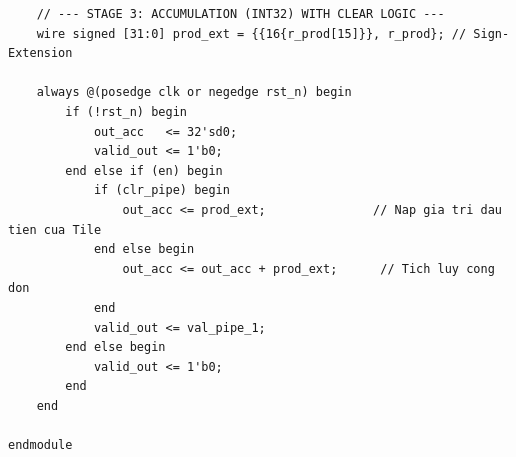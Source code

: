 \documentclass[11pt,a4paper]{article}
\begin{document}
\begin{lstlisting}
    // --- STAGE 3: ACCUMULATION (INT32) WITH CLEAR LOGIC ---
    wire signed [31:0] prod_ext = {{16{r_prod[15]}}, r_prod}; // Sign-Extension

    always @(posedge clk or negedge rst_n) begin
        if (!rst_n) begin
            out_acc   <= 32'sd0;
            valid_out <= 1'b0;
        end else if (en) begin
            if (clr_pipe) begin
                out_acc <= prod_ext;               // Nap gia tri dau tien cua Tile
            end else begin
                out_acc <= out_acc + prod_ext;      // Tich luy cong don
            end
            valid_out <= val_pipe_1;
        end else begin
            valid_out <= 1'b0;
        end
    end

endmodule
\end{lstlisting}
\end{document}
